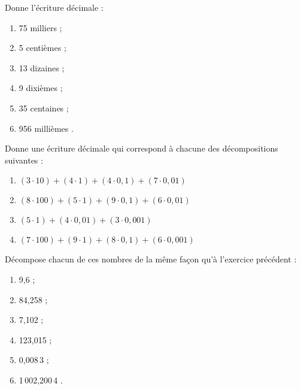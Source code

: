 
\begin{exercice}
Donne l'écriture décimale :
\begin{enumerate} 
 \item 75 milliers \dotfill ; 

 \item 5 centièmes \dotfill ; 

 \item 13 dizaines \dotfill ; 

 \item 9 dixièmes \dotfill ; 

 \item 35 centaines \dotfill ;

 \item 956 millièmes \dotfill. 

 \end{enumerate}
\end{exercice}


\begin{exercice}[Décomposition]
Donne une écriture décimale qui correspond à chacune des décompositions suivantes :
\begin{enumerate}
 \item $(3 \cdot 10) + (4 \cdot 1) + (4 \cdot 0,1) + (7 \cdot 0,01)$
 \item $(8 \cdot 100) + (5 \cdot 1) + (9 \cdot 0,1) + (6 \cdot 0,01)$
 \item $(5 \cdot 1) + (4 \cdot 0,01) + (3 \cdot 0,001)$
 \item $(7 \cdot 100) + (9 \cdot 1) + (8 \cdot 0,1) + (6 \cdot 0,001)$
 \end{enumerate}
\end{exercice}


\begin{exercice}
Décompose chacun de ces nombres de la même façon qu'à l'exercice précédent :
\begin{enumerate} 
 \item 9,6 \dotfill ; 
 
 \item 84,258 \dotfill ; 
 
 \item 7,102 \dotfill ;
 
 \item 123,015 \dotfill ; 
 
 \item 0,008\,3 \dotfill ; 
 
 \item 1\,002,200\,4 \dotfill.
 
 \end{enumerate}
\end{exercice}

